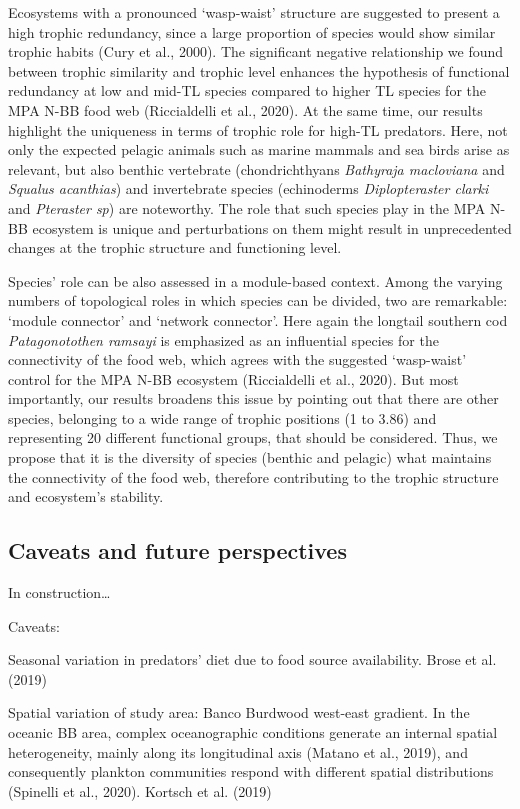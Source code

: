 \documentclass[preprint, 3p,
authoryear]{elsarticle} %
\begin{document}
Ecosystems with a pronounced `wasp-waist' structure are suggested to
present a high trophic redundancy, since a large proportion of species
would show similar trophic habits (Cury et al., 2000). The significant
negative relationship we found between trophic similarity and trophic
level enhances the hypothesis of functional redundancy at low and mid-TL
species compared to higher TL species for the MPA N-BB food web
(Riccialdelli et al., 2020). At the same time, our results highlight the
uniqueness in terms of trophic role for high-TL predators. Here, not
only the expected pelagic animals such as marine mammals and sea birds
arise as relevant, but also benthic vertebrate (chondrichthyans
\emph{Bathyraja macloviana} and \emph{Squalus acanthias}) and
invertebrate species (echinoderms \emph{Diplopteraster clarki} and
\emph{Pteraster sp}) are noteworthy. The role that such species play in
the MPA N-BB ecosystem is unique and perturbations on them might result
in unprecedented changes at the trophic structure and functioning level.

Species' role can be also assessed in a module-based context. Among the
varying numbers of topological roles in which species can be divided,
two are remarkable: `module connector' and `network connector'. Here
again the longtail southern cod \emph{Patagonotothen ramsayi} is
emphasized as an influential species for the connectivity of the food
web, which agrees with the suggested `wasp-waist' control for the MPA
N-BB ecosystem (Riccialdelli et al., 2020). But most importantly, our
results broadens this issue by pointing out that there are other
species, belonging to a wide range of trophic positions (1 to 3.86) and
representing 20 different functional groups, that should be considered.
Thus, we propose that it is the diversity of species (benthic and
pelagic) what maintains the connectivity of the food web, therefore
contributing to the trophic structure and ecosystem's stability.

\hypertarget{caveats-and-future-perspectives}{%
\subsection{Caveats and future
perspectives}\label{caveats-and-future-perspectives}}

In construction\ldots{}

Caveats:

Seasonal variation in predators' diet due to food source availability.
Brose et al. (2019)

Spatial variation of study area: Banco Burdwood west-east gradient. In
the oceanic BB area, complex oceanographic conditions generate an
internal spatial heterogeneity, mainly along its longitudinal axis
(Matano et al., 2019), and consequently plankton communities respond
with different spatial distributions (Spinelli et al., 2020). Kortsch et
al. (2019)
\end{document}

